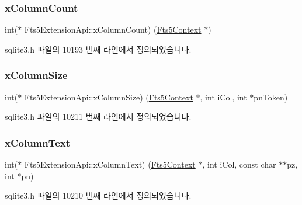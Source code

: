 \subsubsection{\texorpdfstring{x\+Column\+Count}{xColumnCount}}
{\footnotesize\ttfamily int($\ast$ Fts5\+Extension\+Api\+::x\+Column\+Count) (\hyperlink{sqlite3_8h_a97821b95ebebd43db901977ffd5b26bc}{Fts5\+Context} $\ast$)}



sqlite3.\+h 파일의 10193 번째 라인에서 정의되었습니다.

\mbox{\label{struct_fts5_extension_api_aefe6eb4685546e58f056a61da39a2bcb}} 
\subsubsection{\texorpdfstring{x\+Column\+Size}{xColumnSize}}
{\footnotesize\ttfamily int($\ast$ Fts5\+Extension\+Api\+::x\+Column\+Size) (\hyperlink{sqlite3_8h_a97821b95ebebd43db901977ffd5b26bc}{Fts5\+Context} $\ast$, int i\+Col, int $\ast$pn\+Token)}



sqlite3.\+h 파일의 10211 번째 라인에서 정의되었습니다.

\mbox{\label{struct_fts5_extension_api_a03c7fcd31a751fc34d25e5288045f91d}} 
\subsubsection{\texorpdfstring{x\+Column\+Text}{xColumnText}}
{\footnotesize\ttfamily int($\ast$ Fts5\+Extension\+Api\+::x\+Column\+Text) (\hyperlink{sqlite3_8h_a97821b95ebebd43db901977ffd5b26bc}{Fts5\+Context} $\ast$, int i\+Col, const char $\ast$$\ast$pz, int $\ast$pn)}



sqlite3.\+h 파일의 10210 번째 라인에서 정의되었습니다.

\mbox{\label{struct_fts5_extension_api_a096e79406ae03df9796a2082d0ac8269}} 

